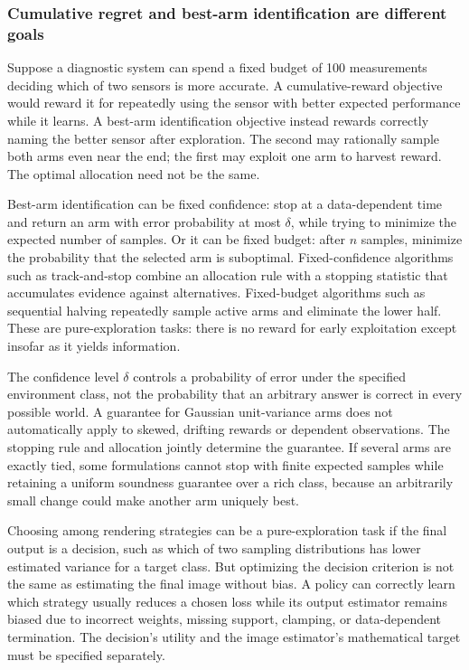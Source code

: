 \subsubsection{Cumulative regret and best-arm identification are different goals}\label{cumulative-regret-and-best-arm-identification-are-different-goals}

Suppose a diagnostic system can spend a fixed budget of 100 measurements deciding which of two sensors is more accurate. A cumulative-reward objective would reward it for repeatedly using the sensor with better expected performance while it learns. A best-arm identification objective instead rewards correctly naming the better sensor after exploration. The second may rationally sample both arms even near the end; the first may exploit one arm to harvest reward. The optimal allocation need not be the same.

Best-arm identification can be fixed confidence: stop at a data-dependent time and return an arm with error probability at most \(\delta\), while trying to minimize the expected number of samples. Or it can be fixed budget: after \(n\) samples, minimize the probability that the selected arm is suboptimal. Fixed-confidence algorithms such as track-and-stop combine an allocation rule with a stopping statistic that accumulates evidence against alternatives. Fixed-budget algorithms such as sequential halving repeatedly sample active arms and eliminate the lower half. These are pure-exploration tasks: there is no reward for early exploitation except insofar as it yields information.

The confidence level \(\delta\) controls a probability of error under the specified environment class, not the probability that an arbitrary answer is correct in every possible world. A guarantee for Gaussian unit-variance arms does not automatically apply to skewed, drifting rewards or dependent observations. The stopping rule and allocation jointly determine the guarantee. If several arms are exactly tied, some formulations cannot stop with finite expected samples while retaining a uniform soundness guarantee over a rich class, because an arbitrarily small change could make another arm uniquely best.

Choosing among rendering strategies can be a pure-exploration task if the final output is a decision, such as which of two sampling distributions has lower estimated variance for a target class. But optimizing the decision criterion is not the same as estimating the final image without bias. A policy can correctly learn which strategy usually reduces a chosen loss while its output estimator remains biased due to incorrect weights, missing support, clamping, or data-dependent termination. The decision's utility and the image estimator's mathematical target must be specified separately.

